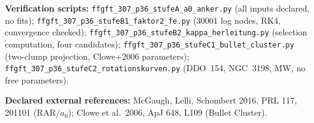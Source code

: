 \documentclass[11pt]{report}
\begin{document}
\medskip
\noindent\textbf{Verification scripts:}
\texttt{ffgft\_307\_p36\_stufeA\_a0\_anker.py} (all inputs declared, no fits);
\texttt{ffgft\_307\_p36\_stufeB1\_faktor2\_fe.py} (30001 log nodes, RK4, convergence checked);
\texttt{ffgft\_307\_p36\_stufeB2\_kappa\_herleitung.py} (selection computation, four candidates);
\texttt{ffgft\_307\_p36\_stufeC1\_bullet\_cluster.py} (two-clump projection, Clowe+2006 parameters);
\texttt{ffgft\_307\_p36\_stufeC2\_rotationskurven.py} (DDO~154, NGC~3198, MW, no free parameters).

\medskip
\noindent\textbf{Declared external references:}
McGaugh, Lelli, Schombert 2016, PRL 117, 201101 (RAR/$a_0$);
Clowe et al.\ 2006, ApJ 648, L109 (Bullet Cluster).
\end{document}
